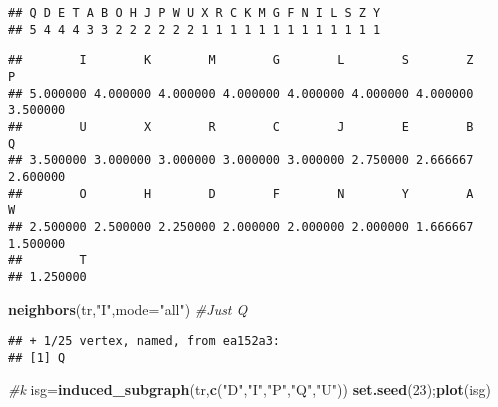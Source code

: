\documentclass[
]{article}
\newenvironment{Shaded}{\begin{snugshade}}{\end{snugshade}}
\newcommand{\CommentTok}[1]{\textcolor[rgb]{0.56,0.35,0.01}{\textit{#1}}}
\newcommand{\DataTypeTok}[1]{\textcolor[rgb]{0.13,0.29,0.53}{#1}}
\newcommand{\DecValTok}[1]{\textcolor[rgb]{0.00,0.00,0.81}{#1}}
\newcommand{\KeywordTok}[1]{\textcolor[rgb]{0.13,0.29,0.53}{\textbf{#1}}}
\newcommand{\NormalTok}[1]{#1}
\newcommand{\OperatorTok}[1]{\textcolor[rgb]{0.81,0.36,0.00}{\textbf{#1}}}
\newcommand{\StringTok}[1]{\textcolor[rgb]{0.31,0.60,0.02}{#1}}
\begin{document}
\begin{Shaded}
\end{Shaded}

\begin{verbatim}
## Q D E T A B O H J P W U X R C K M G F N I L S Z Y 
## 5 4 4 4 3 3 2 2 2 2 2 2 1 1 1 1 1 1 1 1 1 1 1 1 1
\end{verbatim}

\begin{Shaded}
\end{Shaded}

\begin{verbatim}
##        I        K        M        G        L        S        Z        P 
## 5.000000 4.000000 4.000000 4.000000 4.000000 4.000000 4.000000 3.500000 
##        U        X        R        C        J        E        B        Q 
## 3.500000 3.000000 3.000000 3.000000 3.000000 2.750000 2.666667 2.600000 
##        O        H        D        F        N        Y        A        W 
## 2.500000 2.500000 2.250000 2.000000 2.000000 2.000000 1.666667 1.500000 
##        T 
## 1.250000
\end{verbatim}

\begin{Shaded}
\begin{Highlighting}[]
\KeywordTok{neighbors}\NormalTok{(tr,}\StringTok{"I"}\NormalTok{,}\DataTypeTok{mode=}\StringTok{"all"}\NormalTok{)      }\CommentTok{#Just Q}
\end{Highlighting}
\end{Shaded}

\begin{verbatim}
## + 1/25 vertex, named, from ea152a3:
## [1] Q
\end{verbatim}

\begin{Shaded}
\begin{Highlighting}[]
\CommentTok{#k}
\NormalTok{isg=}\KeywordTok{induced_subgraph}\NormalTok{(tr,}\KeywordTok{c}\NormalTok{(}\StringTok{"D"}\NormalTok{,}\StringTok{"I"}\NormalTok{,}\StringTok{"P"}\NormalTok{,}\StringTok{"Q"}\NormalTok{,}\StringTok{"U"}\NormalTok{))}
\KeywordTok{set.seed}\NormalTok{(}\DecValTok{23}\NormalTok{);}\KeywordTok{plot}\NormalTok{(isg)}
\end{Highlighting}
\end{Shaded}
\end{document}

